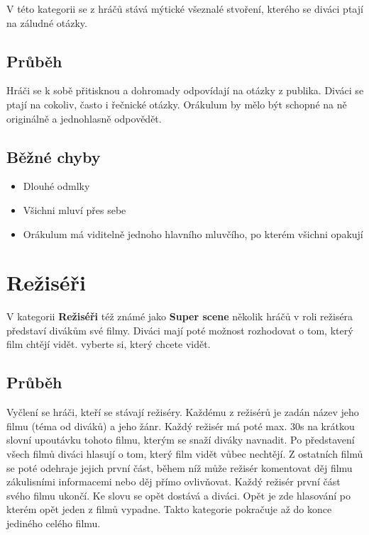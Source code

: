 V této kategorii se z hráčů stává mýtické všeznalé stvoření, kterého se diváci ptají na záludné otázky. 
 
\subsection{ Průběh } Hráči se k sobě přitisknou a dohromady odpovídají na otázky z publika. Diváci se ptají na cokoliv, často i řečnické otázky. Orákulum by mělo být schopné na ně originálně a jednohlasně odpovědět. 
 
\subsection{ Běžné chyby } \begin{itemize}
\item Dlouhé odmlky
\item Všichni mluví přes sebe
\item Orákulum má viditelně jednoho hlavního mluvčího, po kterém všichni opakují
\end{itemize}
 
 
 
 
\needspace{5cm} \section{Režiséři} \label{režiséři}  
 
V kategorii \textbf{Režiséři}{} též známé jako \textbf{Super scene}{} několik hráčů v roli režiséra představí divákům své filmy. Diváci mají poté možnost rozhodovat o tom, který film chtějí vidět. vyberte si, který chcete vidět. 
 
\subsection{Průběh} Vyčlení se hráči, kteří se stávají režiséry. Každému z režisérů je zadán název jeho filmu (téma od diváků) a jeho žánr. Každý režisér má poté max. 30s na krátkou slovní upoutávku tohoto filmu, kterým se snaží diváky navnadit. Po představení všech filmů diváci hlasují o tom, který film vidět vůbec nechtějí. Z ostatních filmů se poté odehraje jejich první část, během níž může režisér komentovat děj filmu zákulisními informacemi nebo děj přímo ovlivňovat. Každý režisér první část svého filmu ukončí. Ke slovu se opět dostává  a diváci. Opět je zde hlasování po kterém opět jeden z filmů vypadne. Takto kategorie pokračuje až do konce jediného celého filmu. 
 
